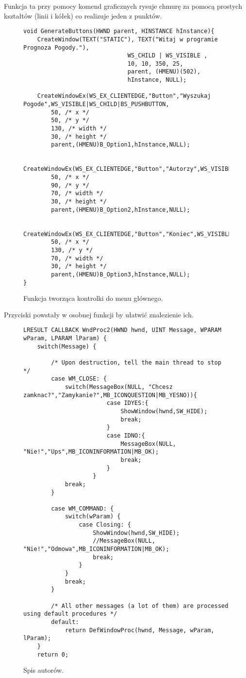 \documentclass[a4paper,twoside,12pt]{mgr}
\begin{document}
Funkcja ta przy pomocy komend graficznych rysuje chmurę za pomocą prostych kształtów (linii i kółek) co realizuje jeden z punktów.

\begin{figure}[H]
\centering
\begin{lstlisting}[frame=single]	
void GenerateButtons(HWND parent, HINSTANCE hInstance){
	CreateWindow(TEXT("STATIC"), TEXT("Witaj w programie Prognoza Pogody."),
                              WS_CHILD | WS_VISIBLE ,
                              10, 10, 350, 25,
                              parent, (HMENU)(502),
                              hInstance, NULL);
		
	CreateWindowEx(WS_EX_CLIENTEDGE,"Button","Wyszukaj Pogode",WS_VISIBLE|WS_CHILD|BS_PUSHBUTTON,
		50, /* x */
		50, /* y */
		130, /* width */
		30, /* height */
		parent,(HMENU)B_Option1,hInstance,NULL);
	
	CreateWindowEx(WS_EX_CLIENTEDGE,"Button","Autorzy",WS_VISIBLE|WS_CHILD|BS_PUSHBUTTON,
		50, /* x */
		90, /* y */
		70, /* width */
		30, /* height */
		parent,(HMENU)B_Option2,hInstance,NULL);
		
	CreateWindowEx(WS_EX_CLIENTEDGE,"Button","Koniec",WS_VISIBLE|WS_CHILD|BS_PUSHBUTTON,
		50, /* x */
		130, /* y */
		70, /* width */
		30, /* height */
		parent,(HMENU)B_Option3,hInstance,NULL);
}
\end{lstlisting}
\caption{Funkcja tworząca kontrolki do menu głównego.}%
\label{rys:etykieta}
\end{figure}
Przyciski powstały w osobnej funkcji by ułatwić znalezienie ich.
\begin{figure}[H]
\centering
\begin{lstlisting}[frame=single]	
LRESULT CALLBACK WndProc2(HWND hwnd, UINT Message, WPARAM wParam, LPARAM lParam) {
	switch(Message) {
		
		/* Upon destruction, tell the main thread to stop */
		case WM_CLOSE: {
			switch(MessageBox(NULL, "Chcesz zamknac?","Zamykanie?",MB_ICONQUESTION|MB_YESNO)){
						case IDYES:{
							ShowWindow(hwnd,SW_HIDE);
							break;
						}
						case IDNO:{
							MessageBox(NULL, "Nie!","Ups",MB_ICONINFORMATION|MB_OK);
							break;
						}
					}
			break;
		}
		
		case WM_COMMAND: {
			switch(wParam) {
				case Closing: {
					ShowWindow(hwnd,SW_HIDE);
					//MessageBox(NULL, "Nie!","Odmowa",MB_ICONINFORMATION|MB_OK);
					break;
				}
			}
			break;
		}
		
		/* All other messages (a lot of them) are processed using default procedures */
		default:
			return DefWindowProc(hwnd, Message, wParam, lParam);
	}
	return 0;
\end{lstlisting}
\caption{Spis autorów.}%
\label{rys:etykieta}
\end{figure}
\end{document}
